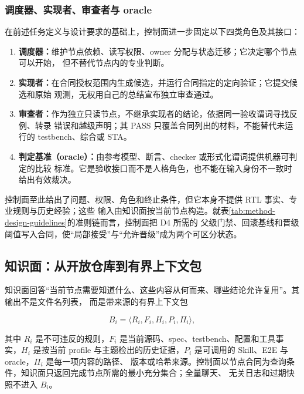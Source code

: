 \documentclass[UTF8,a4paper,zihao=-4,oneside]{ctexart}
\begin{document}
\subsubsection{调度器、实现者、审查者与 oracle}

在前述任务定义与设计要求的基础上，控制面进一步固定以下四类角色及其接口：

\begin{enumerate}[label=\arabic*.,leftmargin=2.2em,itemsep=0.25em,topsep=0.35em]
  \item \textbf{调度器：}维护节点依赖、读写权限、owner 分配与状态迁移；它决定哪个节点可以开始，
  但不替代节点内的专业判断。
  \item \textbf{实现者：}在合同授权范围内生成候选，并运行合同指定的定向验证；它提交候选和原始
  观测，无权用自己的总结宣布独立审查通过。
  \item \textbf{审查者：}作为独立只读节点，不继承实现者的结论，依据同一验收谓词寻找反例、转录
  错误和越级声明；其 PASS 只覆盖合同列出的材料，不能替代未运行的 testbench、综合或 STA。
  \item \textbf{判定基准（oracle）：}由参考模型、断言、checker 或形式化谓词提供机器可判定的比较
  标准。它是验收接口而不是人格角色，也不能在输入身份不一致时给出有效裁决。
\end{enumerate}

控制面至此给出了问题、权限、角色和终止条件，但它本身不提供 RTL 事实、专业规则与历史经验；这些
输入由知识面按当前节点构造。就表\ref{tab:method-design-guidelines}的准则链而言，控制面把 D4 所需的
父级门禁、回滚基线和晋级阈值写入合同，使“局部接受”与“允许晋级”成为两个可区分状态。

\subsection{知识面：从开放仓库到有界上下文包}

知识面回答“当前节点需要知道什么、这些内容从何而来、哪些结论允许复用”。其输出不是文件名列表，
而是带来源的有界上下文包

\[
B_i=\langle R_i,F_i,H_i,P_i,\Pi_i\rangle,
\]

其中 $R_i$ 是不可违反的规则，$F_i$ 是当前源码、spec、testbench、配置和工具事实，$H_i$ 是按当前
profile 与主题检出的历史证据，$P_i$ 是可调用的 Skill、E2E 与 oracle，$\Pi_i$ 是每一项内容的路径、
版本或哈希来源。控制面以节点合同为查询条件，知识面只返回完成节点所需的最小充分集合；全量聊天、
无关日志和过期快照不进入 $B_i$。
\end{document}
